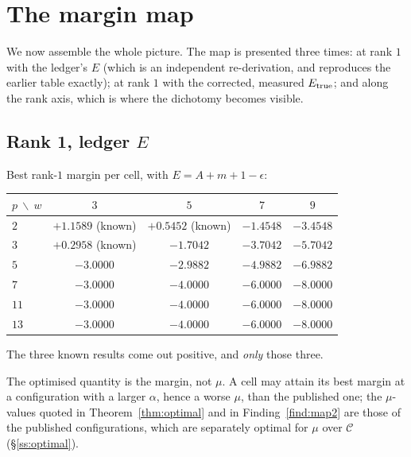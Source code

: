 \section{The margin map}\label{sec:map}

We now assemble the whole picture. The map is presented three times: at rank $1$ with the
ledger's $E$ (which is an independent re-derivation, and reproduces the earlier table
exactly); at rank $1$ with the corrected, measured $E_{\mathrm{true}}$; and along the rank axis, which
is where the dichotomy becomes visible.

\subsection{Rank 1, ledger \texorpdfstring{$E$}{E}}\label{ss:map61}

\begin{finding}\label{find:map1}
 Best rank-$1$ margin per cell, with $E=A+m+1-\epsilon$:
\begin{center}
\tabsmall
\begin{tabular}{lcccc}
\toprule
$p\ \backslash\ w$ & $3$ & $5$ & $7$ & $9$\\
\midrule
$2$ & $\mathbf{+1.1589}$ (known) & $\mathbf{+0.5452}$ (known) & $-1.4548$ & $-3.4548$\\
$3$ & $\mathbf{+0.2958}$ (known) & $-1.7042$ & $-3.7042$ & $-5.7042$\\
$5$ & $-3.0000$ & $-2.9882$ & $-4.9882$ & $-6.9882$\\
$7$ & $-3.0000$ & $-4.0000$ & $-6.0000$ & $-8.0000$\\
$11$ & $-3.0000$ & $-4.0000$ & $-6.0000$ & $-8.0000$\\
$13$ & $-3.0000$ & $-4.0000$ & $-6.0000$ & $-8.0000$\\
\bottomrule
\end{tabular}
\end{center}
The three known results come out positive, and \emph{only} those three.
\end{finding}

\begin{remark}\label{rem:readtable}
The optimised quantity is the margin, not $\mu$. A cell may attain its best margin at a
configuration with a larger $\alpha$, hence a worse $\mu$, than the published one; the
$\mu$-values quoted in Theorem~\ref{thm:optimal} and in Finding~\ref{find:map2} are those of
the published configurations, which are separately optimal for $\mu$ over $\mathcal C$
(\S\ref{ss:optimal}).
\end{remark}

